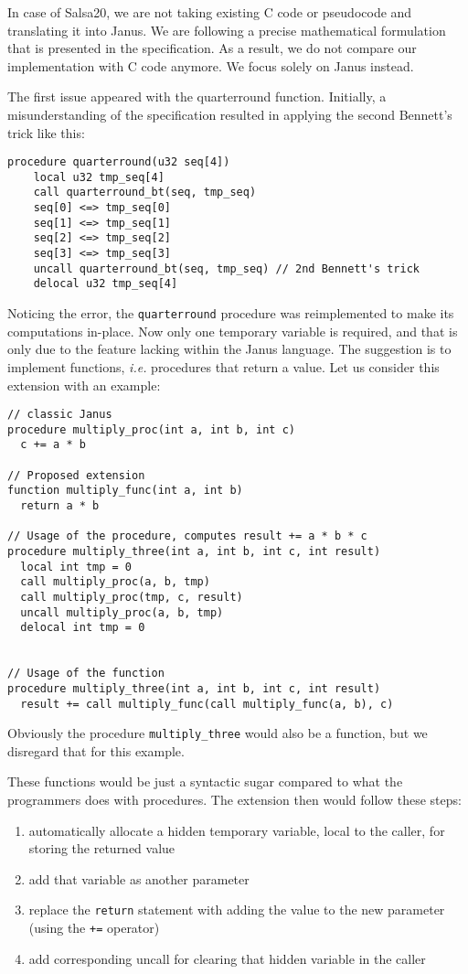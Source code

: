 \documentclass[a4paper,10pt,openright]{memoir}
\newcommand{\ie}{\emph{i.e.}\xspace}
\newcommand{\code}[1]{\texttt{#1}}
\begin{document}
In case of Salsa20, we are not taking existing C code or pseudocode and 
translating it into Janus. We are following a precise mathematical 
formulation that is presented in the specification\cite{salsa}. As a 
result, we do not compare our implementation with C code anymore. 
We focus solely on Janus instead.

The first issue appeared with the quarterround function. Initially, a 
misunderstanding of the specification resulted in applying the second 
Bennett's trick like this:

\begin{lstlisting}[language=Janus]
procedure quarterround(u32 seq[4])
	local u32 tmp_seq[4]
	call quarterround_bt(seq, tmp_seq)
	seq[0] <=> tmp_seq[0]
	seq[1] <=> tmp_seq[1]
	seq[2] <=> tmp_seq[2]
	seq[3] <=> tmp_seq[3]
	uncall quarterround_bt(seq, tmp_seq) // 2nd Bennett's trick
	delocal u32 tmp_seq[4]
\end{lstlisting}

Noticing the error, the \code{quarterround} procedure was reimplemented 
to make its computations in-place. Now only one temporary variable is 
required, and that is only due to the feature lacking within the Janus 
language. The suggestion is to implement functions, \ie procedures that 
return a value. Let us consider this extension with an example:

\begin{lstlisting}[language=Janus]
// classic Janus
procedure multiply_proc(int a, int b, int c)
  c += a * b

// Proposed extension
function multiply_func(int a, int b)
  return a * b

// Usage of the procedure, computes result += a * b * c
procedure multiply_three(int a, int b, int c, int result)
  local int tmp = 0
  call multiply_proc(a, b, tmp)
  call multiply_proc(tmp, c, result)
  uncall multiply_proc(a, b, tmp)
  delocal int tmp = 0


// Usage of the function
procedure multiply_three(int a, int b, int c, int result)
  result += call multiply_func(call multiply_func(a, b), c)
\end{lstlisting}

Obviously the procedure \code{multiply\_three} would also be a function, 
but we disregard that for this example.

These functions would be just a syntactic sugar compared to what the 
programmers does with procedures. The extension then would follow these 
steps:

\begin{enumerate}
\item automatically allocate a hidden temporary variable, local to the caller, for storing the returned value
\item add that variable as another parameter
\item replace the \code{return} statement with adding the value to the new parameter (using the \code{+=} operator)
\item add corresponding uncall for clearing that hidden variable in the caller
\end{enumerate}
\end{document}
